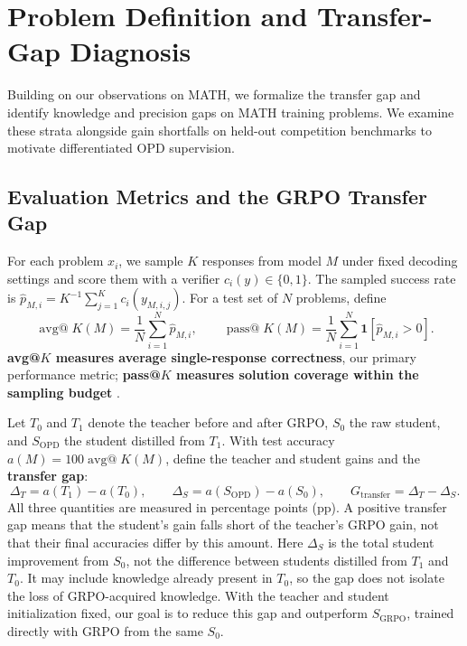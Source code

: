 \documentclass[10pt]{article}
\makeatletter
\newcommand{\avgk}{avg@$K$}
\newcommand{\passk}{pass@$K$}
\makeatother
\begin{document}
\section{Problem Definition and Transfer-Gap Diagnosis}
\label{sec:diagnosis}

Building on our observations on MATH, we formalize the transfer gap and identify
knowledge and precision gaps on MATH training problems. We examine these strata
alongside gain shortfalls on held-out competition benchmarks to motivate
differentiated OPD supervision.

\subsection{Evaluation Metrics and the GRPO Transfer Gap}

For each problem $x_i$, we sample $K$ responses from model $M$ under fixed
decoding settings and score them with a verifier $c_i(y)\in\{0,1\}$.
The sampled success rate is
$\widehat p_{M,i}=K^{-1}\sum_{j=1}^{K}c_i(y_{M,i,j})$.
For a test set of $N$ problems, define
\begin{equation}
\operatorname{avg@}K(M)=\frac{1}{N}\sum_{i=1}^{N}\widehat p_{M,i},
\qquad
\operatorname{pass@}K(M)=\frac{1}{N}\sum_{i=1}^{N}\mathbf 1[\widehat p_{M,i}>0].
\label{eq:metrics}
\end{equation}
\textbf{\avgk{} measures average single-response correctness}, our primary
performance metric; \textbf{\passk{} measures solution coverage within the
sampling budget} \citep{chen2021evaluating}.

Let $T_0$ and $T_1$ denote the teacher before and after GRPO, $S_0$ the raw
student, and $S_{\mathrm{OPD}}$ the student distilled from $T_1$. With test
accuracy $a(M)=100\operatorname{avg@}K(M)$, define the teacher and student gains
and the \textbf{transfer gap}:
\begin{equation}
\Delta_T=a(T_1)-a(T_0),\qquad
\Delta_S=a(S_{\mathrm{OPD}})-a(S_0),\qquad
G_{\mathrm{transfer}}=\Delta_T-\Delta_S.
\label{eq:transfer}
\end{equation}
All three quantities are measured in percentage points (pp). A positive transfer
gap means that the student's gain falls short of the teacher's GRPO gain,
not that their final accuracies differ by this amount.
Here $\Delta_S$ is the total student improvement from $S_0$, not the difference
between students distilled from $T_1$ and $T_0$. It may include knowledge already
present in $T_0$, so the gap does not isolate the loss of GRPO-acquired knowledge.
With the teacher and student initialization fixed, our goal is to reduce this
gap and outperform $S_{\mathrm{GRPO}}$, trained directly with GRPO from the same $S_0$.
\end{document}
